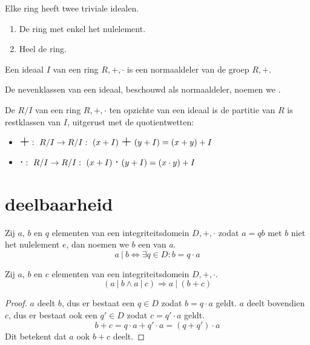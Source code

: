 \documentclass[main.tex]{subfiles}
\begin{document}
\begin{st}
  Elke ring heeft twee triviale idealen.
  \begin{enumerate}
  \item De ring met enkel het nulelement.
  \item Heel de ring.
  \end{enumerate}
\end{st}

\begin{ei}
  Een ideaal $I$ van een ring $R,+,\cdot$ is een normaaldeler van de groep $R,+$.
\end{ei}

\begin{de}
  De nevenklassen van een ideaal, beschouwd als normaaldeler, noemen we .
\end{de}

\begin{de}
  De  $R/I$ van een ring $R,+,\cdot$ ten opzichte van een ideaal is de partitie van $R$ is restklassen van $I$, uitgerust met de quotientwetten:
  \begin{itemize}
  \item $\scalebox{1.5}{$+$}:\ R/I \rightarrow R/I:\ (x+I)\ \scalebox{1.5}{$+$}\ (y+I) = (x+y)+I$
  \item $\scalebox{1.5}{$\cdot$}:\ R/I \rightarrow R/I:\ (x+I)\ \scalebox{1.5}{$\cdot$}\ (y+I) = (x\cdot y) + I$
  \end{itemize}
\end{de}






\section{deelbaarheid}
\label{sec:deelbaarheid}

\begin{de}
  Zij $a$, $b$ en $q$ elementen van een integriteitsdomein $D,+,\cdot$ zodat $a= qb$ met $b$ niet het nulelement $e$, dan noemen we $b$ een  van $a$.
  \[ a\ |\ b \Leftrightarrow \exists q \in D: b = q\cdot a \]
\end{de}

\begin{st}
  Zij $a$, $b$ en $c$ elementen van een integriteitsdomein $D,+,\cdot$.
  \[ (a\ |\ b \wedge a\ |\ c) \Rightarrow a\ |\ (b+c) \]

  \begin{proof}
    $a$ deelt $b$, dus er bestaat een $q \in D$ zodat $b=q\cdot a$ geldt.
    $a$ deelt bovendien $c$, dus er bestaat ook een $q'\in D$ zodat $c = q'\cdot a$ geldt. 
    \[
      b + c = q\cdot a + q'\cdot a = (q+q')\cdot a 
    \]
    Dit betekent dat $a$ ook $b+c$ deelt.
  \end{proof}
\end{st}
\end{document}
